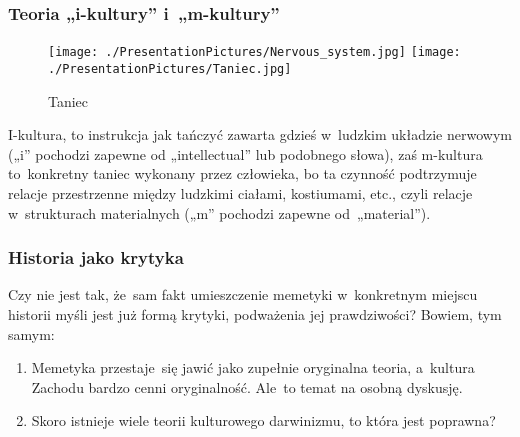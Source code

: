 \documentclass[10pt,t]{beamer}
\begin{document}
\begin{frame}
  \frametitle{Teoria „i-kultury” i~„m-kultury”}


  \begin{figure}

    \centering

    \texttt{[image: ./PresentationPictures/Nervous\_system.jpg]}
    \texttt{[image: ./PresentationPictures/Taniec.jpg]}


    \caption{Taniec}

  \end{figure}


  I-kultura, to instrukcja jak tańczyć zawarta gdzieś
  w~ludzkim układzie nerwowym („i” pochodzi zapewne od
  „intellectual” lub podobnego słowa), zaś m-kultura
  to~konkretny taniec wykonany przez człowieka, bo ta czynność
  podtrzymuje relacje przestrzenne między ludzkimi ciałami,
  kostiumami, etc., czyli relacje w~strukturach materialnych („m”
  pochodzi zapewne od~„material”).

\end{frame}





\begin{frame}
  \frametitle{Historia jako krytyka}


  Czy nie jest tak, że~sam fakt
  umieszczenie memetyki w~konkretnym miejscu historii myśli jest już
  formą krytyki, podważenia jej prawdziwości? Bowiem, tym samym:

  \begin{enumerate}

  \item Memetyka przestaje~się jawić jako zupełnie oryginalna
    teoria, a~kultura Zachodu bardzo cenni oryginalność. Ale~to
    temat na osobną dyskusję.

  \item Skoro istnieje wiele teorii kulturowego darwinizmu, to która
    jest poprawna?

  \end{enumerate}

\end{frame}
\end{document}
